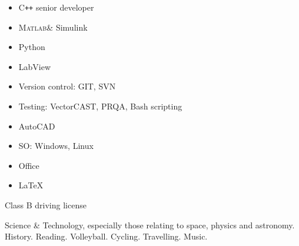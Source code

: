 \documentclass[helvetica,openbib,logo,notitle,flagCMYK,totpages, english]{europecv}
\newcommand{\MATLAB}{\textsc{Matlab}\xspace}
\begin{document}
\begin{europecv}
{
\begin{itemize}
\item C\texttt{++} senior developer
\item \MATLAB \& Simulink
\item Python
\item LabView
\item Version control: GIT, SVN
\item Testing: VectorCAST, PRQA, Bash scripting
\item AutoCAD
\item SO: Windows, Linux
\item Office
\item \LaTeX
\end{itemize}
}

{
Class B driving license
}


{
Science \& Technology, especially those relating to space, physics and astronomy. History. Reading. Volleyball. Cycling. Travelling. Music.
}


\end{europecv}
\end{document}
